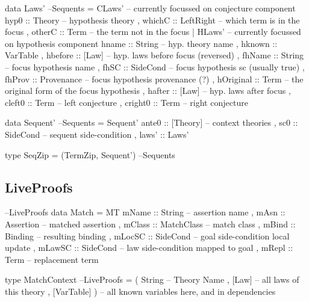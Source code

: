 \begin{code}
data Laws'                                                          --Sequents
  = CLaws' { -- currently focussed on conjecture component
      hyp0  :: Theory -- hypothesis theory
    , whichC :: LeftRight -- which term is in the focus
    , otherC :: Term  -- the term not in the focus
    }
  | HLaws' { -- currently focussed on hypothesis component
      hname     :: String -- hyp. theory name
    , hknown    :: VarTable
    , hbefore   :: [Law] -- hyp. laws before focus (reversed)
    , fhName    :: String -- focus hypothesis name
    , fhSC      :: SideCond -- focus hypothesis sc (usually true)
    , fhProv    :: Provenance -- focus hypothesis provenance (?)
    , hOriginal :: Term -- the original form of the focus hypothesis
    , hafter    :: [Law] -- hyp. laws after focus
    , cleft0    :: Term -- left conjecture
    , cright0   :: Term -- right conjecture
    }
\end{code}


\begin{code}
data Sequent'                                                       --Sequents
  = Sequent' {
      ante0 :: [Theory] -- context theories
    , sc0       :: SideCond -- sequent side-condition
    , laws'     :: Laws'
    }
\end{code}


\begin{code}
type SeqZip = (TermZip, Sequent')                                   --Sequents
\end{code}

\subsection{LiveProofs}

\begin{code}                                                      --LiveProofs
data Match
 = MT { mName  ::  String     -- assertion name
      , mAsn   ::  Assertion  -- matched assertion
      , mClass ::  MatchClass -- match class
      , mBind  ::  Binding    -- resulting binding
      , mLocSC ::  SideCond   -- goal side-condition local update
      , mLawSC ::  SideCond   -- law side-condition mapped to goal
      , mRepl  ::  Term       -- replacement term
      }
\end{code}

\begin{code}
type MatchContext                                                 --LiveProofs
  = ( String       -- Theory Name
    , [Law]        -- all laws of this theory
    , [VarTable] ) -- all known variables here, and in dependencies
\end{code}

